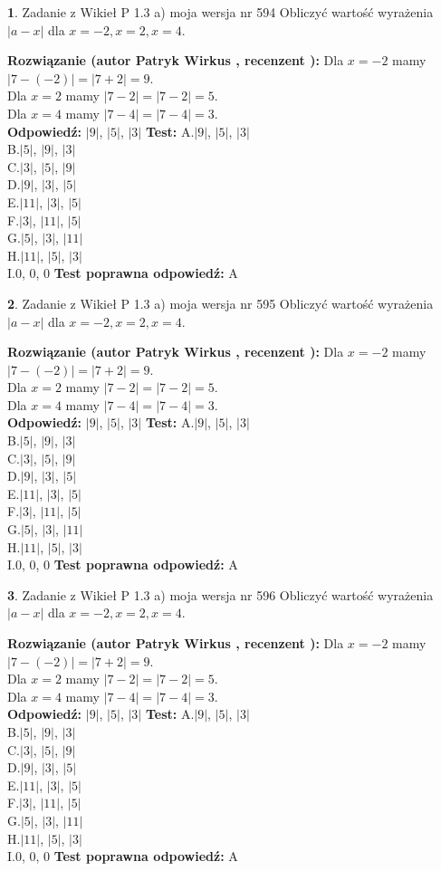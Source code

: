 \documentclass[12pt, a4paper]{article}
\theoremstyle{definition} %
\newtheorem{zad}{}
\newcommand{\zadStart}[1]{\begin{zad}#1\newline}
\newcommand{\zadStop}{\end{zad}}
\newcommand{\rozwStart}[2]{\noindent \textbf{Rozwiązanie (autor #1 , recenzent #2): }\newline}
\newcommand{\rozwStop}{\newline}
\newcommand{\odpStart}{\noindent \textbf{Odpowiedź:}\newline}
\newcommand{\odpStop}{\newline}
\newcommand{\testStart}{\noindent \textbf{Test:}\newline}
\newcommand{\testStop}{\newline}
\newcommand{\kluczStart}{\noindent \textbf{Test poprawna odpowiedź:}\newline}
\newcommand{\kluczStop}{\newline}
\begin{document}
\zadStart{Zadanie z Wikieł P 1.3 a) moja wersja nr 594}
Obliczyć wartość wyrażenia $|a - x|$ dla $x=-2,x=2,x=4$.
\zadStop
\rozwStart{Patryk Wirkus}{}
Dla $x = -2$ mamy $|7 - (-2)| = |7 + 2| = 9$.\\
Dla $x = 2$ mamy $|7 - 2| = |7 - 2| = 5$.\\
Dla $x = 4$ mamy $|7 - 4| = |7 - 4| = 3$.\\
\rozwStop
\odpStart
$|9|$, $|5|$, $|3|$
\odpStop
\testStart
A.$|9|$, $|5|$, $|3|$\\
B.$|5|$, $|9|$, $|3|$\\
C.$|3|$, $|5|$, $|9|$\\
D.$|9|$, $|3|$, $|5|$\\
E.$|11|$, $|3|$, $|5|$\\
F.$|3|$, $|11|$, $|5|$\\
G.$|5|$, $|3|$, $|11|$\\
H.$|11|$, $|5|$, $|3|$\\
I.$0$, $0$, $0$
\testStop
\kluczStart
A
\kluczStop



\zadStart{Zadanie z Wikieł P 1.3 a) moja wersja nr 595}
Obliczyć wartość wyrażenia $|a - x|$ dla $x=-2,x=2,x=4$.
\zadStop
\rozwStart{Patryk Wirkus}{}
Dla $x = -2$ mamy $|7 - (-2)| = |7 + 2| = 9$.\\
Dla $x = 2$ mamy $|7 - 2| = |7 - 2| = 5$.\\
Dla $x = 4$ mamy $|7 - 4| = |7 - 4| = 3$.\\
\rozwStop
\odpStart
$|9|$, $|5|$, $|3|$
\odpStop
\testStart
A.$|9|$, $|5|$, $|3|$\\
B.$|5|$, $|9|$, $|3|$\\
C.$|3|$, $|5|$, $|9|$\\
D.$|9|$, $|3|$, $|5|$\\
E.$|11|$, $|3|$, $|5|$\\
F.$|3|$, $|11|$, $|5|$\\
G.$|5|$, $|3|$, $|11|$\\
H.$|11|$, $|5|$, $|3|$\\
I.$0$, $0$, $0$
\testStop
\kluczStart
A
\kluczStop



\zadStart{Zadanie z Wikieł P 1.3 a) moja wersja nr 596}
Obliczyć wartość wyrażenia $|a - x|$ dla $x=-2,x=2,x=4$.
\zadStop
\rozwStart{Patryk Wirkus}{}
Dla $x = -2$ mamy $|7 - (-2)| = |7 + 2| = 9$.\\
Dla $x = 2$ mamy $|7 - 2| = |7 - 2| = 5$.\\
Dla $x = 4$ mamy $|7 - 4| = |7 - 4| = 3$.\\
\rozwStop
\odpStart
$|9|$, $|5|$, $|3|$
\odpStop
\testStart
A.$|9|$, $|5|$, $|3|$\\
B.$|5|$, $|9|$, $|3|$\\
C.$|3|$, $|5|$, $|9|$\\
D.$|9|$, $|3|$, $|5|$\\
E.$|11|$, $|3|$, $|5|$\\
F.$|3|$, $|11|$, $|5|$\\
G.$|5|$, $|3|$, $|11|$\\
H.$|11|$, $|5|$, $|3|$\\
I.$0$, $0$, $0$
\testStop
\kluczStart
A
\kluczStop
\end{document}
